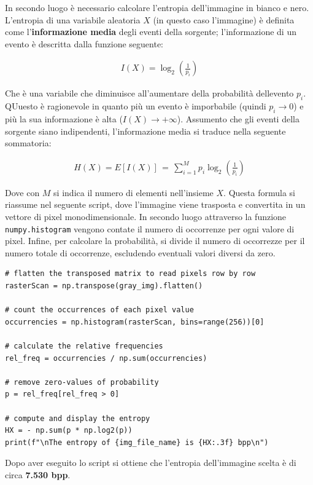 \FloatBarrier\noindent In secondo luogo è necessario calcolare l'entropia dell'immagine in bianco e nero. L'entropia di una variabile aleatoria $X$ (in questo caso l'immagine) è definita come l'\textbf{informazione media} degli eventi della sorgente; l'informazione di un evento è descritta dalla funzione seguente:

\begin{gather*}
    I(X) = \log_2\left( \frac{1}{p_i} \right)
\end{gather*}

\noindent Che è una variabile che diminuisce all'aumentare della probabilità dellevento $p_i$. QUuesto è ragionevole in quanto più un evento è imporbabile (quindi $p_i \to 0$) e più la sua informazione è alta ($I(X) \to +\infty$). Assumento che gli eventi della sorgente siano indipendenti, l'informazione media si traduce nella seguente sommatoria:

\begin{gather*}
    H(X) = E[I(X)] \, = \, \sum_{i = 1}^M p_i\log_2\left( \frac{1}{p_i} \right)
\end{gather*}

\noindent Dove con $M$ si indica il numero di elementi nell'insieme $X$. Questa formula si riassume nel seguente script, dove l'immagine viene trasposta e convertita in un vettore di pixel monodimensionale. In secondo luogo attraverso la funzione \texttt{numpy.histogram} vengono contate il numero di occorrenze per ogni valore di pixel. Infine, per calcolare la probabilità, si divide il numero di occorrezze per il numero totale di occorrenze, escludendo eventuali valori diversi da zero.


\begin{lstlisting}
# flatten the transposed matrix to read pixels row by row
rasterScan = np.transpose(gray_img).flatten()

# count the occurrences of each pixel value
occurrencies = np.histogram(rasterScan, bins=range(256))[0]

# calculate the relative frequencies
rel_freq = occurrencies / np.sum(occurrencies)

# remove zero-values of probability
p = rel_freq[rel_freq > 0]

# compute and display the entropy
HX = - np.sum(p * np.log2(p))
print(f"\nThe entropy of {img_file_name} is {HX:.3f} bpp\n")
\end{lstlisting}

\noindent Dopo aver eseguito lo script si ottiene che l'entropia dell'immagine scelta è di circa \textbf{7.530 bpp}.





